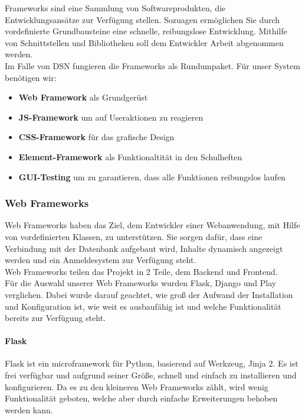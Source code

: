 
Frameworks sind eine Sammlung von Softwareprodukten, die Entwicklungsansätze zur Verfügung stellen. Sozuagen ermöglichen Sie durch vordefinierte Grundbausteine eine schnelle, reibungslose Entwicklung. Mithilfe von Schnittstellen und Bibliotheken soll dem Entwickler Arbeit abgenommen werden.\\
Im Falle von DSN fungieren die Frameworks als Rundumpaket. Für unser System benötigen wir:
\begin{itemize}
\item \textbf{Web Framework} als Grundgerüst
\item \textbf{JS-Framework} um auf Useraktionen zu reagieren
\item \textbf{CSS-Framework} für das grafische Design
\item \textbf{Element-Framework} als Funktionaltität in den Schulheften
\item \textbf{GUI-Testing} um zu garantieren, dass alle Funktionen reibungslos laufen
\end{itemize}

\subsubsection{Web Frameworks}
Web Frameworks haben das Ziel, dem Entwickler einer Webanwendung, mit Hilfe von vordefinierten Klassen, zu unterstützen. Sie sorgen dafür, dass eine Verbindung mit der Datenbank aufgebaut wird, Inhalte dynamisch angezeigt werden und ein Anmeldesystem zur Verfügung steht.\\
Web Frameworks teilen das Projekt in 2 Teile, dem Backend und Frontend.\\
Für die Auswahl unserer Web Frameworks wurden Flask, Django und Play verglichen. Dabei wurde darauf geachtet, wie groß der Aufwand der Installation und Konfiguration ist, wie weit es ausbaufähig ist und welche Funktionalität bereits zur Verfügung steht.
\paragraph{Flask}
\grqq{}Flask ist ein microframework für Python, basierend auf Werkzeug, Jinja 2.\grqq{}\cite{FLASK} Es ist frei verfügbar und aufgrund seiner Größe, schnell und einfach zu installieren und konfigurieren. Da es zu den kleineren Web Frameworks zählt, wird wenig Funktionalität geboten, welche aber durch einfache Erweiterungen behoben werden kann.\cite{FLASK}\\


